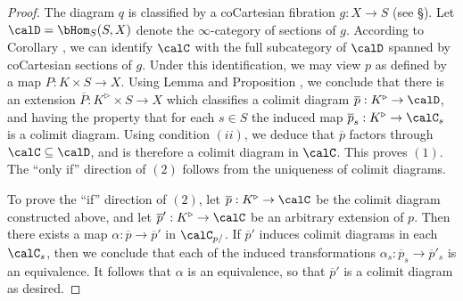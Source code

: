 \begin{proof}
The diagram $q$ is classified by a coCartesian fibration $g: X \rightarrow S$ (see \S {}). Let $\calD = \bHom_{S}(S,X)$ denote the $\infty$-category of sections of $g$. 
According to Corollary , we can identify $\calC$ with the full subcategory of
$\calD$ spanned by coCartesian sections of $g$. Under this identification, we may view
$p$ as defined by a map $P: K \times S \rightarrow X$. Using Lemma 
and Proposition , we conclude that there is an extension
$\overline{P}: K^{\triangleright} \times S \rightarrow X$ which classifies a 
colimit diagram $\overline{p}: K^{\triangleright} \rightarrow \calD$, and having
the property that for each $s \in S$ the induced map $\overline{p}_{s}: K^{\triangleright} \rightarrow \calC_{s}$ is a colimit diagram. Using condition $(ii)$, we deduce that $\overline{p}$ factors
through $\calC \subseteq \calD$, and is therefore a colimit diagram in $\calC$.
This proves $(1)$. The ``only if'' direction of $(2)$ follows from the uniqueness of colimit diagrams.

To prove the ``if'' direction of $(2)$, let $\overline{p}: K^{\triangleright} \rightarrow
\calC$ be the colimit diagram constructed above, and let $\overline{p}': K^{\triangleright} \rightarrow \calC$ be an arbitrary extension of $p$. Then there exists a map $\alpha: \overline{p} \rightarrow \overline{p}'$ in $\calC_{p/}$. If $\overline{p}'$ induces colimit diagrams in
each $\calC_{s}$, then we conclude that each of the induced transformations
$\alpha_{s}: \overline{p}_s \rightarrow \overline{p}'_{s}$ is an equivalence. It follows
that $\alpha$ is an equivalence, so that $\overline{p}'$ is a colimit diagram as desired.
\end{proof}

